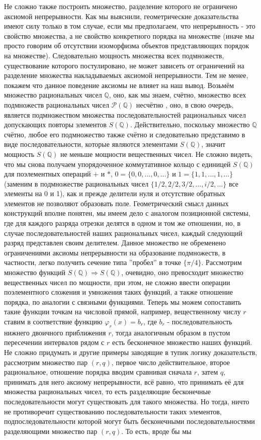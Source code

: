 \documentclass[12pt]{article}
\begin{document}
Не сложно также построить множество, разделение которого не ограничено аксиомой непрерывности. Как мы выяснили, геометрические доказательства имеют силу только в том случае, если мы предполагаем, что непрерывность - это свойство множества, а не свойство конкретного порядка на множестве (иначе мы просто говорим об отсутствии изоморфизма объектов представляющих порядок на множестве). Следовательно мощность множества всех подмножеств, существование которого постулировано, не может зависеть от ограничений на разделение множества накладываемых аксиомой непрерывности. Тем не менее, покажем что данное поведение аксиомы не влияет на наш вывод. Возьмём множество рациональных чисел $\mathbb{Q}$, оно, как мы знаем, счётно, множество всех подмножеств рациональных чисел $\mathcal{P}(\mathbb{Q})$ несчётно \cite{cantor-common}, оно, в свою очередь, является подмножеством множества последовательностей рациональных чисел допускающих повторы элементов $S(\mathbb{Q})$. Действительно, поскольку множество $\mathbb{Q}$ счётно, любое его подмножество также счётно и следовательно представимо в виде последовательности, которые являются элементами $S(\mathbb{Q})$, значит мощность $S(\mathbb{Q})$ не меньше мощности вещественных чисел. Не сложно видеть, что мы снова получаем упорядоченное коммутативное кольцо с единицей $S(\mathbb{Q})$ для поэлементных операций $+$ и $*$, $0 = \{0, 0, \dots, 0, \dots\}$ и $1 = \{1, 1, \dots, 1, \dots\}$ (заменим в подмножестве рациональных чисел $\{1/2, 2/2, 3/2, \dots, i/2, \dots\}$ все элементы на 0 и 1), как и прежде делители нуля и отсутствие обратных элементов не позволяют образовать поле. Геометрический смысл данных конструкций вполне понятен, мы имеем дело с аналогом позиционной системы, где для каждого разряда отрезки делятся в одном и том же отношении, но, в случае последовательностей наших рациональных чисел, каждый следующий разряд представлен своим делителем. Данное множество не обременено ограничениями аксиомы непрерывности на образование подмножеств, в частности, легко получить сечение типа ''пробел'' в точке $\{\pi/4\}$. Рассмотрим множество функций $S(\mathbb{Q}) \Rightarrow S(\mathbb{Q})$, очевидно, оно превосходит множество вещественных чисел по мощности, при этом, не сложно ввести операции поэлементного сложения и умножения таких функций, а также отношение порядка, по аналогии с связными функциями. Теперь мы можем сопоставить такие функции точкам на числовой прямой, например, вещественному числу $r$ ставим в соответствие функцию $\varphi_r(x) = b_r$, где $b_r$ - последовательность нижнего двоичного приближения $r$, тогда аналогичным образом в пустом пересечении интервалов рядом с $r$ есть бесконечное множество наших функций. Не сложно придумать и другие примеры заводящие в тупик логику доказательств, рассмотрим множество пар $(r, q)$, первое число действительное, второе рациональное, отношение порядка вводим сравнивая сначала $r$, затем $q$, принимать для него аксиому непрерывности, всё равно, что принимать её для множества рациональных чисел, то есть разделяющие бесконечные последовательности могут существовать для такого множества. Но тогда, ничто не противоречит существованию последовательности таких элементов, подпоследовательности которой могут быть бесконечными последовательностями разделяющими множество пар $(r, q)$. То есть, вроде бы мы 
\end{document}

